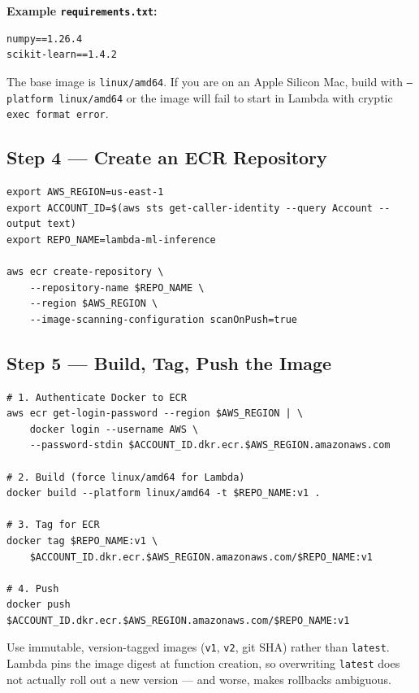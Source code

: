 \documentclass[11pt,a4paper]{article}
\begin{document}
\textbf{Example \texttt{requirements.txt}:}
\begin{lstlisting}[style=bashcode]
numpy==1.26.4
scikit-learn==1.4.2
\end{lstlisting}

\begin{warnbox}
The base image is \texttt{linux/amd64}. If you are on an Apple Silicon Mac,
build with \texttt{--platform linux/amd64} or the image will fail to start in
Lambda with cryptic \texttt{exec format error}.
\end{warnbox}

\subsection{Step 4 --- Create an ECR Repository}

\begin{lstlisting}[style=bashcode]
export AWS_REGION=us-east-1
export ACCOUNT_ID=$(aws sts get-caller-identity --query Account --output text)
export REPO_NAME=lambda-ml-inference

aws ecr create-repository \
    --repository-name $REPO_NAME \
    --region $AWS_REGION \
    --image-scanning-configuration scanOnPush=true
\end{lstlisting}

\subsection{Step 5 --- Build, Tag, Push the Image}

\begin{lstlisting}[style=bashcode]
# 1. Authenticate Docker to ECR
aws ecr get-login-password --region $AWS_REGION | \
    docker login --username AWS \
    --password-stdin $ACCOUNT_ID.dkr.ecr.$AWS_REGION.amazonaws.com

# 2. Build (force linux/amd64 for Lambda)
docker build --platform linux/amd64 -t $REPO_NAME:v1 .

# 3. Tag for ECR
docker tag $REPO_NAME:v1 \
    $ACCOUNT_ID.dkr.ecr.$AWS_REGION.amazonaws.com/$REPO_NAME:v1

# 4. Push
docker push $ACCOUNT_ID.dkr.ecr.$AWS_REGION.amazonaws.com/$REPO_NAME:v1
\end{lstlisting}

\begin{tipbox}
Use immutable, version-tagged images (\texttt{v1}, \texttt{v2}, git SHA) rather
than \texttt{latest}. Lambda pins the image digest at function creation, so
overwriting \texttt{latest} does not actually roll out a new version --- and
worse, makes rollbacks ambiguous.
\end{tipbox}
\end{document}
